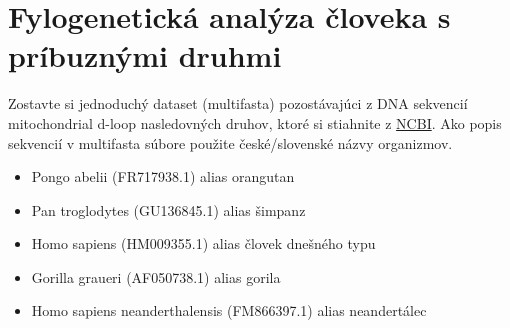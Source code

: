 \documentclass[11pt]{article}
\begin{document}
\section{Fylogenetická analýza človeka s príbuznými druhmi}
\label{sec:org76a6dc4}
Zostavte si jednoduchý dataset (multifasta) pozostávajúci z DNA sekvencií
mitochondrial d-loop nasledovných druhov, ktoré si stiahnite z \href{http://www.ncbi.nlm.nih.gov/nuccore/}{NCBI}. Ako popis
sekvencií v multifasta súbore použite české/slovenské názvy organizmov.
\begin{itemize}
\item Pongo abelii (FR717938.1) alias orangutan
\item Pan troglodytes (GU136845.1) alias šimpanz
\item Homo sapiens (HM009355.1) alias človek dnešného typu
\item Gorilla graueri (AF050738.1) alias gorila
\item Homo sapiens neanderthalensis (FM866397.1) alias neandertálec
\end{itemize}
\end{document}
